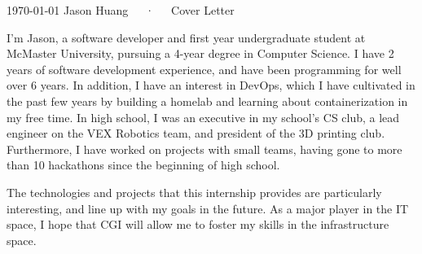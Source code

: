 \documentclass[11pt, a4paper]{awesome-cv}
\begin{document}
\makecvheader[R]

\makecvfooter
  {\today}
  {Jason Huang~~~·~~~Cover Letter}
  {}

\makelettertitle

\begin{cvletter}

I'm Jason, a software developer and first year undergraduate student at McMaster University,
pursuing a 4-year degree in Computer Science.
I have 2 years of software development experience, 
and have been programming for well over 6 years.
In addition, I have an interest in DevOps, 
which I have cultivated in the past few years by building a homelab 
and learning about containerization in my free time.
In high school, I was an executive in my school's CS club,
a lead engineer on the VEX Robotics team,
and president of the 3D printing club.
Furthermore, I have worked on projects with small teams, 
having gone to more than 10 hackathons since the beginning of high school.

The technologies and projects that this internship provides are particularly interesting,
and line up with my goals in the future.
As a major player in the IT space,
I hope that CGI will allow me to foster my skills in the infrastructure space.


\end{cvletter}
\end{document}
